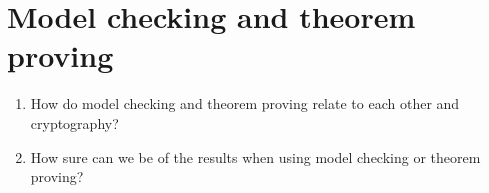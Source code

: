 \section{Model checking and theorem proving}

\begin{frame}
  \begin{question}
    \begin{enumerate}
      \item How do model checking and theorem proving relate to each other and 
        cryptography?
      \item How sure can we be of the results when using model checking or 
        theorem proving?
    \end{enumerate}
  \end{question}
\end{frame}
